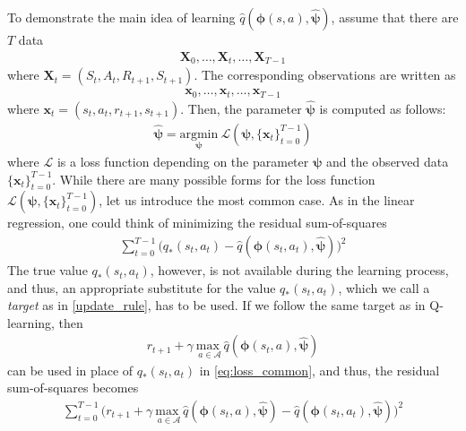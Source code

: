 To demonstrate the main idea of learning  $\hat{q}(\boldsymbol{\phi}(s,a), \widehat{\boldsymbol{\psi}})$, assume that there are $T$ data
\begin{align}
    \mathbf{X}_0, \dots, \mathbf{X}_t, \dots, \mathbf{X}_{T-1}
\end{align}
where $\mathbf{X}_t = (S_t, A_t, R_{t+1}, S_{t+1})$. The corresponding observations are written as
\begin{align}
    \mathbf{x}_0, \dots, \mathbf{x}_t, \dots, \mathbf{x}_{T-1}
\end{align}
where $\mathbf{x}_t = (s_t, a_t, r_{t+1}, s_{t+1})$. Then, the parameter $\widehat{\boldsymbol{\psi}}$ is computed as follows:
\begin{align}
    \widehat{\boldsymbol{\psi}} = \underset{\boldsymbol{\psi}}{\text{argmin}} \ \mathcal{L}\left(\boldsymbol{\psi}, \{\mathbf{x}_t\}_{t=0}^{T-1}\right)
\end{align}
where $\mathcal{L}$ is a loss function depending on the parameter $\boldsymbol{\psi}$ and the observed data $\{\mathbf{x}_t\}_{t=0}^{T-1}$. While there are many possible forms for the loss function $\mathcal{L}\left(\boldsymbol{\psi}, \{\mathbf{x}_t\}_{t=0}^{T-1}\right)$, let us introduce the most common case. As in the linear regression, one could think of minimizing the residual sum-of-squares
\begin{align}
    \sum_{t=0}^{T-1}\Big(q_\ast\left(s_t,a_t\right)-\hat{q}\left(\boldsymbol{\phi}\left(s_t,a_t\right), \widehat{\boldsymbol{\psi}}\right)\Big)^2
    \label{eq:loss_common}
\end{align}
The true value $q_\ast(s_t,a_t)$, however, is not available during the learning process, and thus, an appropriate substitute for the value $q_\ast(s_t,a_t)$, which we call a \textit{target} as in \eqref{update_rule}, has to be used. If we follow the same target as in Q-learning, then \begin{align}
    r_{t+1} + \gamma \  \underset{a \in \mathcal{A}}{\text{max }}\hat{q}(\boldsymbol{\phi}(s_t, a), \widehat{\boldsymbol{\psi}})
\end{align} can be used in place of $q_\ast(s_t,a_t)$ in \eqref{eq:loss_common}, and thus, the residual sum-of-squares becomes
\begin{align}
        \sum_{t=0}^{T-1}\Big(r_{t+1} + \gamma \  \underset{a \in \mathcal{A}}{\text{max }}\hat{q}\left(\boldsymbol{\phi}(s_t, a), \widehat{\boldsymbol{\psi}}\right)-\hat{q}\left(\boldsymbol{\phi}\left(s_t,a_t\right), \widehat{\boldsymbol{\psi}}\right)\Big)^2
    \label{eq:loss_common_qlearning}
\end{align}

